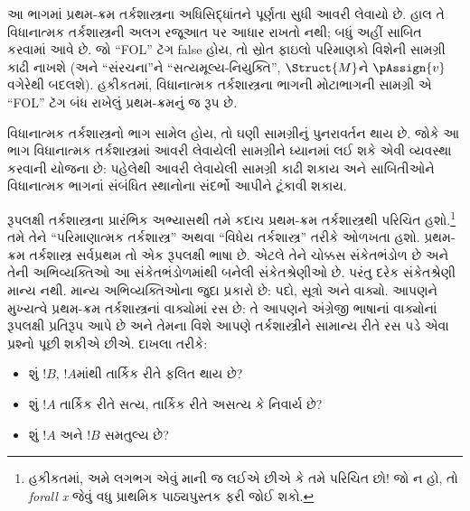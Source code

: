 
\label{guunit:OLP-0138}


\begin{editorial}
  આ ભાગમાં પ્રથમ-ક્રમ તર્કશાસ્ત્રના અધિસિદ્ધાંતને પૂર્ણતા સુધી આવરી
  લેવાયો છે. હાલ તે વિધાનાત્મક તર્કશાસ્ત્રની અલગ રજૂઆત પર આધાર રાખતો
  નથી; બધું અહીં સાબિત કરવામાં આવે છે. જો ``FOL'' ટૅગ false હોય, તો
  સ્રોત ફાઇલો પરિમાણકો વિશેની સામગ્રી કાઢી નાખશે (અને
  ``સંરચના''ને ``સત્યમૂલ્ય-નિયુક્તિ'', $\Struct{M}$ને $\pAssign{v}$
  વગેરેથી બદલશે). હકીકતમાં, વિધાનાત્મક તર્કશાસ્ત્રના ભાગની મોટાભાગની
  સામગ્રી એ ``FOL'' ટૅગ બંધ રાખેલું પ્રથમ-ક્રમનું જ રૂપ છે.

  વિધાનાત્મક તર્કશાસ્ત્રનો ભાગ સામેલ હોય, તો ઘણી સામગ્રીનું પુનરાવર્તન
  થાય છે. જોકે આ ભાગ વિધાનાત્મક તર્કશાસ્ત્રમાં આવરી લેવાયેલી સામગ્રીને
  ધ્યાનમાં લઈ શકે એવી વ્યવસ્થા કરવાની યોજના છે: પહેલેથી આવરી લેવાયેલી
  સામગ્રી કાઢી શકાય અને સાબિતીઓને વિધાનાત્મક ભાગનાં સંબંધિત સ્થાનોના
  સંદર્ભો આપીને ટૂંકાવી શકાય.
\end{editorial}

\begingroup
\makeatletter{}\makeatother

\label{guunit:OLP-0139}


\begingroup
\makeatletter{}\makeatother


\label{guunit:OLP-0140}


રૂપલક્ષી તર્કશાસ્ત્રના પ્રારંભિક અભ્યાસથી તમે કદાચ પ્રથમ-ક્રમ
તર્કશાસ્ત્રથી પરિચિત હશો.\footnote{હકીકતમાં, અમે લગભગ એવું માની જ
લઈએ છીએ કે તમે પરિચિત છો!{} જો ન હો, તો \emph{forall x}
\citep{Magnus2021} જેવું વધુ પ્રાથમિક પાઠ્યપુસ્તક ફરી જોઈ શકો.} તમે તેને
``પરિમાણાત્મક તર્કશાસ્ત્ર'' અથવા ``વિધેય તર્કશાસ્ત્ર'' તરીકે ઓળખતા
હશો. પ્રથમ-ક્રમ તર્કશાસ્ત્ર સર્વપ્રથમ તો એક રૂપલક્ષી ભાષા છે. એટલે
તેને ચોક્કસ સંકેતભંડોળ છે અને તેની અભિવ્યક્તિઓ આ સંકેતભંડોળમાંથી બનેલી
સંકેતશ્રેણીઓ છે. પરંતુ દરેક સંકેતશ્રેણી માન્ય નથી. માન્ય અભિવ્યક્તિઓના જુદા
પ્રકારો છે: પદો, સૂત્રો અને વાક્યો. આપણને મુખ્યત્વે
પ્રથમ-ક્રમ તર્કશાસ્ત્રનાં વાક્યોમાં રસ છે: તે આપણને અંગ્રેજી
ભાષાનાં વાક્યોનાં રૂપલક્ષી પ્રતિરૂપ આપે છે અને તેમના વિશે આપણે
તર્કશાસ્ત્રીને સામાન્ય રીતે રસ પડે એવા પ્રશ્નો પૂછી શકીએ છીએ. દાખલા
તરીકે:
\begin{itemize}
    \item શું $!B$, $!A$માંથી તાર્કિક રીતે ફલિત થાય છે?
    \item શું $!A$ તાર્કિક રીતે સત્ય, તાર્કિક રીતે અસત્ય કે
નિવાર્ય છે?
    \item શું $!A$ અને $!B$ સમતુલ્ય છે?
\end{itemize}

